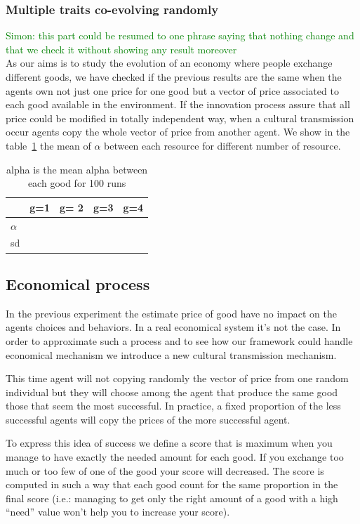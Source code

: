 \documentclass{wscpaperproc}
\newcommand{\memo}[2]{\textcolor{#1}{#2}}
\newcommand{\simon}[1]{\memo{green}{Simon: #1\\}}
\begin{document}
\subsubsection{Multiple traits co-evolving randomly}
\simon{ this part could be resumed to one phrase saying that nothing change and that we check it without showing any result moreover}
As our aims is to study the evolution of an economy where people exchange different goods, we have checked if the previous results are the same when the agents own not just one price for one good but a vector of price associated to each good available in the environment. If the innovation process assure that all price could be modified in totally independent way, when a cultural transmission occur agents copy the whole vector of price from another agent.  We show in the table~\ref{tab:alphagoods} the mean of $\alpha$ between each resource for different number of resource.

\begin{table}
	\centering
		\begin{tabular}{l|cccc}
			  & g=1  & g= 2 & g=3 & g=4 \\\hline
			$\alpha$&\\
			sd \\
		\end{tabular}
	\caption{alpha is the mean alpha between each good for 100 runs }
	\label{tab:alphagoods}
\end{table}




\subsection{ Economical  process}

In the previous experiment the estimate price of good have no impact on the agents choices and behaviors. In a real economical system it's not the case. In order to approximate such a process and to see how our framework could handle economical mechanism we introduce a new cultural transmission mechanism. 

This time agent will not copying randomly the vector of price from one random individual but they will choose among the agent that produce the same good those that seem the most successful. In practice, a fixed proportion of the less successful agents will copy the prices of the more successful agent. 

To express this idea of success we define a score that is maximum when you manage to have exactly the needed amount for each good. If you exchange too much or too few of one of the good your score will decreased. The score is computed in such a way that each good count for the same proportion in the final score (i.e.: managing to get only the right amount of a good with a high ``need'' value won't help you to increase your score).
\end{document}
